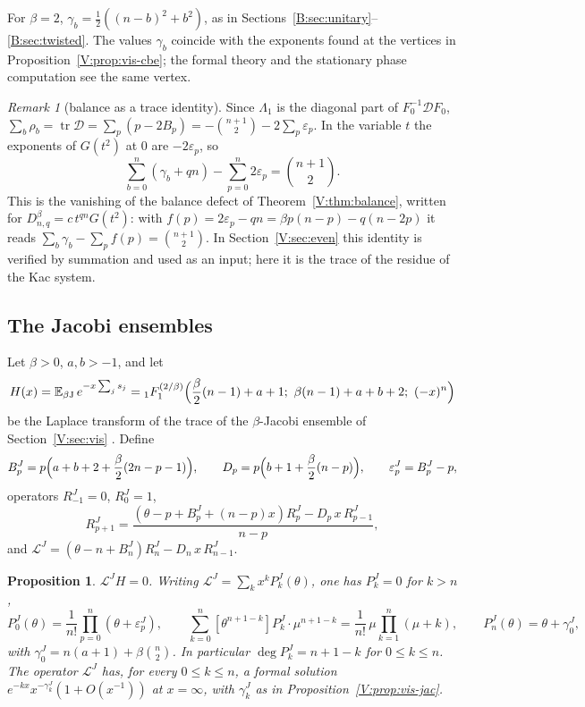 \documentclass[11pt,a4paper]{article}
\newtheorem{proposition}[theorem]{Proposition}
\theoremstyle{definition}
\theoremstyle{remark}
\newtheorem{remark}[theorem]{Remark}
\newcommand{\E}{\mathbb E}
\numberwithin{equation}{section}
\begin{document}
For $\beta=2$, $\gamma_b=\frac12((n-b)^2+b^2)$, as in Sections~\ref{B:sec:unitary}--\ref{B:sec:twisted}. The values $\gamma_b$ coincide with the exponents found at the vertices in Proposition~\ref{V:prop:vis-cbe}; the formal theory and the stationary phase computation see the same vertex.

\begin{remark}[balance as a trace identity]\label{V:rem:trace}
Since $\Lambda_1$ is the diagonal part of $F_0^{-1}\mathcal DF_0$, $\sum_b\rho_b=\operatorname{tr}\mathcal D=\sum_p(p-2B_p)=-\binom{n+1}2-2\sum_p\varepsilon_p$. In the variable $t$ the exponents of $G(t^2)$ at $0$ are $-2\varepsilon_p$, so
\[
\sum_{b=0}^{n}(\gamma_b+qn)-\sum_{p=0}^{n}2\varepsilon_p=\binom{n+1}2 .
\]
This is the vanishing of the balance defect of Theorem~\ref{V:thm:balance}, written for $D^\beta_{n,q}=c\,t^{qn}G(t^2)$: with $f(p)=2\varepsilon_p-qn=\beta p(n-p)-q(n-2p)$ it reads $\sum_b\gamma_b-\sum_pf(p)=\binom{n+1}2$. In Section~\ref{V:sec:even} this identity is verified by summation and used as an input; here it is the trace of the residue of the Kac system.
\end{remark}

\subsection{The Jacobi ensembles}
Let $\beta>0$, $a,b>-1$, and let
\[
H(x)=\E_{\beta\mathrm J}\,e^{-x\sum_js_j}={}_1F_1^{(2/\beta)}\Bigl(\frac\beta2(n-1)+a+1;\ \beta(n-1)+a+b+2;\ (-x)^n\Bigr)
\]
be the Laplace transform of the trace of the $\beta$-Jacobi ensemble of Section~\ref{V:sec:vis} \cite{Kan93,FK22}. Define
\begin{equation}\label{V:eq:BD-jac}
B^J_p=p\Bigl(a+b+2+\frac\beta2(2n-p-1)\Bigr),\qquad D_p=p\Bigl(b+1+\frac\beta2(n-p)\Bigr),\qquad \varepsilon^J_p=B^J_p-p,
\end{equation}
operators $R^J_{-1}=0$, $R^J_0=1$,
\[
R^J_{p+1}=\frac{(\theta-p+B^J_p+(n-p)x)R^J_p-D_p\,x\,R^J_{p-1}}{n-p},
\]
and $\mathcal L^J=(\theta-n+B^J_n)R^J_n-D_n\,x\,R^J_{n-1}$.

\begin{proposition}\label{V:prop:jac-op}
$\mathcal L^JH=0$. Writing $\mathcal L^J=\sum_kx^kP^J_k(\theta)$, one has $P^J_k=0$ for $k>n$,
\[
P^J_0(\theta)=\frac1{n!}\prod_{p=0}^{n}(\theta+\varepsilon^J_p),\qquad\sum_{k=0}^{n}[\theta^{n+1-k}]P^J_k\cdot\mu^{n+1-k}=\frac1{n!}\,\mu\prod_{k=1}^{n}(\mu+k),\qquad P^J_n(\theta)=\theta+\gamma^J_0,
\]
with $\gamma^J_0=n(a+1)+\beta\binom n2$. In particular $\deg P^J_k=n+1-k$ for $0\le k\le n$. The operator $\mathcal L^J$ has, for every $0\le k\le n$, a formal solution $e^{-kx}x^{-\gamma^J_k}(1+O(x^{-1}))$ at $x=\infty$, with $\gamma^J_k$ as in Proposition~\ref{V:prop:vis-jac}.
\end{proposition}
\end{document}
